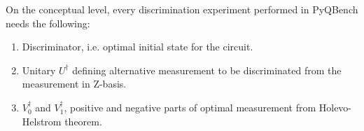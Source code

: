 \documentclass[preprint,12pt, a4paper, dvipsnames]{elsarticle}
\newcommand{\ket}[1]{\ensuremath{|#1\rangle}}
\newcommand{\1}{{\rm 1\hspace{-0.9mm}l}}
\begin{document}
On the conceptual level, every discrimination experiment performed in PyQBench needs the following:
\begin{enumerate}
\item Discriminator, i.e. optimal initial state for the circuit.
\item Unitary $U^\dagger$ defining alternative measurement to be discriminated from the measurement in Z-basis.
\item $V_0^\dagger$ and $V_1^\dagger$, positive and negative parts of optimal measurement from Holevo-Helstrom theorem.
\end{enumerate}
\end{document}
